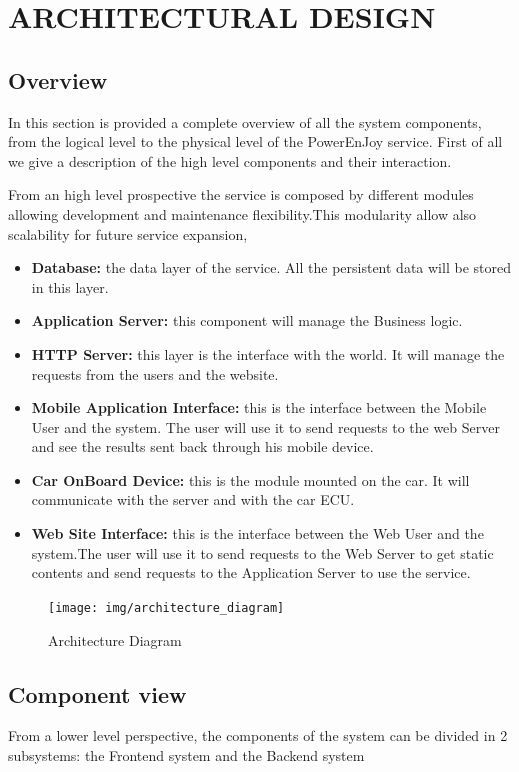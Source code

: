 \section{ARCHITECTURAL DESIGN}
\subsection{Overview} 
In this section is provided a complete overview of all the system components, from the logical level to the physical level of the PowerEnJoy service. First of all we give a description of the high level components and their interaction.\newline

\noindent From an high level prospective the service is composed by different modules allowing development and maintenance flexibility.This modularity allow also scalability for future service expansion,  \newline


\begin{itemize}
\item{\textbf{Database:}} the data layer of the service. All the persistent data will be stored in this layer.
\item{\textbf{Application Server:}} this component will manage the Business logic.
\item{\textbf{HTTP Server:}} this layer is the interface with the world. It will manage the requests from the users and the website.
\item{\textbf{Mobile Application Interface:}} this is the interface between the Mobile User and the system. The user will use it to send requests to the web Server and see the results sent back through his mobile device. 
\item{\textbf{Car OnBoard Device:}} this is the module mounted on the car. It will communicate with the server and with the car ECU.
\item{\textbf{Web Site Interface:}} this is the interface between the Web User and the system.The user will use it to send requests to the Web Server to get static contents and send requests to the Application Server to use the service.
\end{itemize}

	\begin{figure}[H]	
	\centering
	\texttt{[image: img/architecture\_diagram]}
	\caption{Architecture Diagram}
\end{figure}


\newpage
\subsection{Component view} 
From a lower level perspective, the components of the system can be divided in 2 subsystems: the Frontend system and the Backend system


